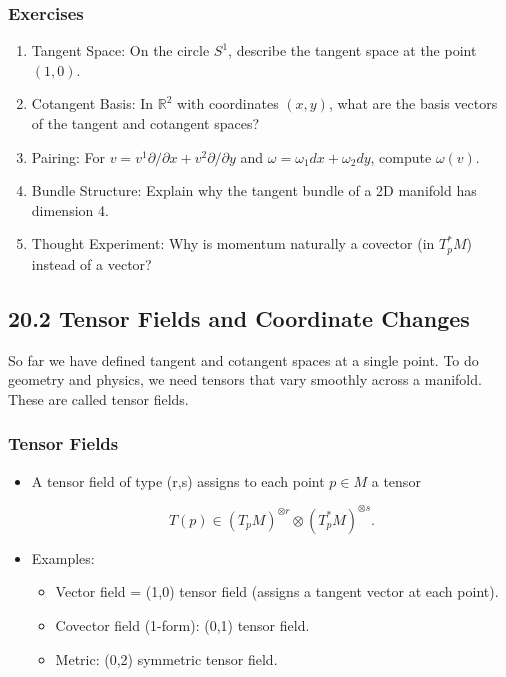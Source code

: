 \documentclass[
  letterpaper,
  DIV=11,
  numbers=noendperiod]{scrreprt}
\providecommand{\tightlist}{%
  \setlength{\itemsep}{0pt}\setlength{\parskip}{0pt}}
\begin{document}
\subsubsection{Exercises}\label{exercises-69}

\begin{enumerate}
\def\labelenumi{\arabic{enumi}.}
\item
  Tangent Space: On the circle \(S^1\), describe the tangent space at
  the point \((1,0)\).
\item
  Cotangent Basis: In \(\mathbb{R}^2\) with coordinates \((x,y)\), what
  are the basis vectors of the tangent and cotangent spaces?
\item
  Pairing: For \(v = v^1 \partial/\partial x + v^2 \partial/\partial y\)
  and \(\omega = \omega_1 dx + \omega_2 dy\), compute \(\omega(v)\).
\item
  Bundle Structure: Explain why the tangent bundle of a 2D manifold has
  dimension 4.
\item
  Thought Experiment: Why is momentum naturally a covector (in
  \(T^*_p M\)) instead of a vector?
\end{enumerate}

\subsection{20.2 Tensor Fields and Coordinate
Changes}\label{tensor-fields-and-coordinate-changes}

So far we have defined tangent and cotangent spaces at a single point.
To do geometry and physics, we need tensors that vary smoothly across a
manifold. These are called tensor fields.

\subsubsection{Tensor Fields}\label{tensor-fields}

\begin{itemize}
\item
  A tensor field of type (r,s) assigns to each point \(p \in M\) a
  tensor

  \[
  T(p) \in (T_pM)^{\otimes r} \otimes (T^*_pM)^{\otimes s}.
  \]
\item
  Examples:

  \begin{itemize}
  \tightlist
  \item
    Vector field = (1,0) tensor field (assigns a tangent vector at each
    point).
  \item
    Covector field (1-form): (0,1) tensor field.
  \item
    Metric: (0,2) symmetric tensor field.
  \end{itemize}
\end{itemize}
\end{document}
